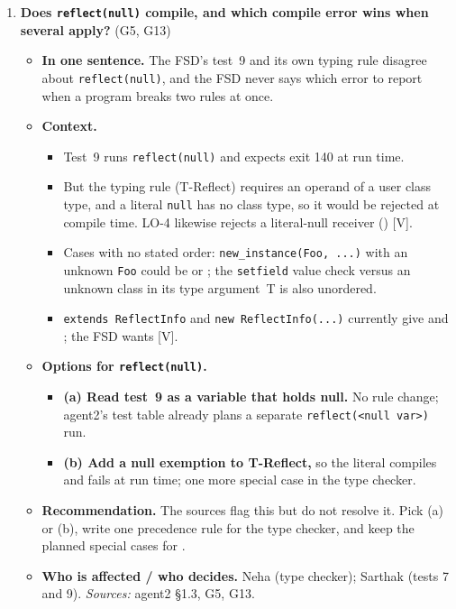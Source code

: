 \documentclass[10pt]{article}
\newcommand{\code}[1]{\texttt{\small #1}}
\newcommand{\mV}{\textsf{\scriptsize[V]}}
\newcommand{\field}[1]{\textbf{#1}\enspace}
\newcommand{\decitem}[1]{\needspace{6\baselineskip}\setcounter{enumi}{\numexpr#1-1\relax}\item}
\begin{document}
\begin{enumerate}[label=\textbf{\arabic*.},ref=\arabic*,leftmargin=1.8em,itemsep=0.8em]
\decitem{10}\label{dec:nullprec}\textbf{Does \code{reflect(null)} compile, and which compile error wins when several apply?} (G5, G13)
\begin{itemize}
\item[] \field{In one sentence.} The FSD's test~9 and its own typing rule disagree about \code{reflect(null)}, and the FSD never says which error to report when a program breaks two rules at once.
\item[] \field{Context.}
\begin{itemize}
\item Test~9 runs \code{reflect(null)} and expects exit 140 at run time.
\item But the typing rule (T-Reflect) requires an operand of a user class type, and a literal \code{null} has no class type, so it would be rejected at compile time. LO-4 likewise rejects a literal-null receiver () \mV.
\item Cases with no stated order: \code{new\_instance(Foo, ...)} with an unknown \code{Foo} could be  or ; the \code{setfield} value check versus an unknown class in its type argument~T is also unordered.
\item \code{extends ReflectInfo} and \code{new ReflectInfo(...)} currently give  and ; the FSD wants  \mV.
\end{itemize}
\item[] \field{Options for \code{reflect(null)}.}
\begin{itemize}
\item \textbf{(a) Read test~9 as a variable that holds null.} No rule change; agent2's test table already plans a separate \code{reflect(<null var>)} run.
\item \textbf{(b) Add a null exemption to T-Reflect,} so the literal compiles and fails at run time; one more special case in the type checker.
\end{itemize}
\item[] \field{Recommendation.} The sources flag this but do not resolve it. Pick (a) or (b), write one precedence rule for the type checker, and keep the planned special cases for .
\item[] \field{Who is affected / who decides.} Neha (type checker); Sarthak (tests 7 and 9). \emph{Sources:} agent2 §1.3, G5, G13.
\end{itemize}


\end{enumerate}
\end{document}
